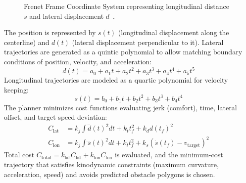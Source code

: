 \documentclass[11pt,a4paper]{report}
\begin{document}
\begin{figure}[H]
\centering
{}
\caption{Frenet Frame Coordinate System representing longitudinal distance $s$ and lateral displacement $d$~\cite{frenet_planner}.}
\label{fig:frenet_frame}
\end{figure}

The position is represented by $s(t)$ (longitudinal displacement along the centerline) and $d(t)$ (lateral displacement perpendicular to it). Lateral trajectories are generated as a quintic polynomial to allow matching boundary conditions of position, velocity, and acceleration:
\begin{equation}
    d(t) = a_0 + a_1 t + a_2 t^2 + a_3 t^3 + a_4 t^4 + a_5 t^5
\end{equation}
Longitudinal trajectories are modeled as a quartic polynomial for velocity keeping:
\begin{equation}
    s(t) = b_0 + b_1 t + b_2 t^2 + b_3 t^3 + b_4 t^4
\end{equation}
The planner minimizes cost functions evaluating jerk (comfort), time, lateral offset, and target speed deviation:
\begin{align}
    C_{\text{lat}} &= k_j \int \dddot{d}(t)^2 dt + k_t t_f^2 + k_d d(t_f)^2 \\
    C_{\text{lon}} &= k_j \int \dddot{s}(t)^2 dt + k_t t_f^2 + k_s (\dot{s}(t_f) - v_{\text{target}})^2
\end{align}
Total cost $C_{\text{total}} = k_{\text{lat}} C_{\text{lat}} + k_{\text{lon}} C_{\text{lon}}$ is evaluated, and the minimum-cost trajectory that satisfies kinodynamic constraints (maximum curvature, acceleration, speed) and avoids predicted obstacle polygons is chosen.
\end{document}
